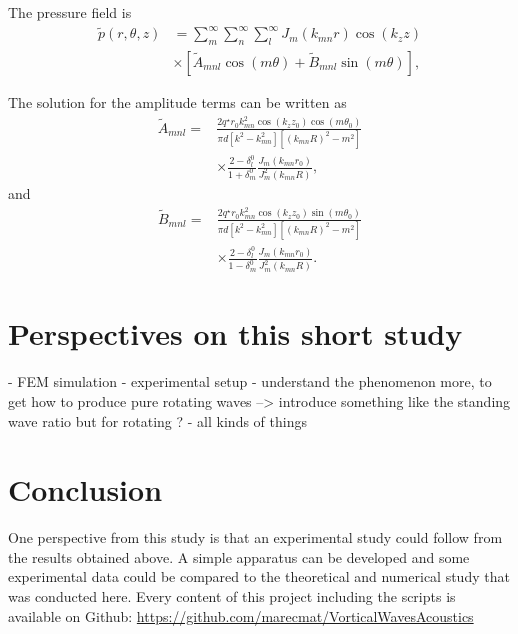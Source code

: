 \documentclass[%
 reprint,
 amsmath,amssymb,
 aip,
]{revtex4-1}
\begin{document}
The pressure field is
\begin{equation}
    \begin{split}
        \tilde{p}(r, \theta, z) &= \sum_m^{\infty}\sum_n^{\infty}\sum_l^{\infty} J_m(k_{mn}r) \cos(k_z z)\\ &\times \left[ \tilde{A}_{mnl} \cos(m \theta) + \tilde{B}_{mnl} \sin(m \theta) \right],
    \end{split}
\end{equation}

The solution for the amplitude terms can be written as 
\begin{equation}
    \begin{split}
        \tilde{A}_{mnl} = &\frac{2 q^{\star} r_0 k^2_{mn} \cos(k_z z_0) \cos(m \theta_0)}{\pi d\left[k^2 - k^2_{mn}\right] \left[(k_{mn}R)^2 - m^2 \right]}\\  &\times \frac{2 - \delta_l^0}{1 + \delta_m^0} \frac{J_m(k_{mn}r_0)}{J^2_{m}(k_{mn}R)},
    \end{split}
\end{equation}
and
\begin{equation}
    \begin{split}
        \tilde{B}_{mnl} = &\frac{2 q^{\star} r_0 k^2_{mn} \cos(k_z z_0) \sin(m \theta_0)}{\pi d\left[k^2 - k^2_{mn}\right] \left[(k_{mn}R)^2 - m^2 \right]}\\  &\times \frac{2 - \delta_l^0}{1 - \delta_m^0} \frac{J_m(k_{mn}r_0)}{J^2_{m}(k_{mn}R)}.
    \end{split}
\end{equation}

\section{Perspectives on this short study}
- FEM simulation
- experimental setup
- understand the phenomenon more, to get how to produce pure rotating waves --> introduce something like the standing wave ratio but for rotating ?
- all kinds of things

\section{Conclusion}
One perspective from this study is that an experimental study could follow from the results obtained above. A simple apparatus can be developed and some experimental data could be compared to the theoretical and numerical study that was conducted here. Every content of this project including the scripts is available on Github: \url{https://github.com/marecmat/VorticalWavesAcoustics}


\end{document}
